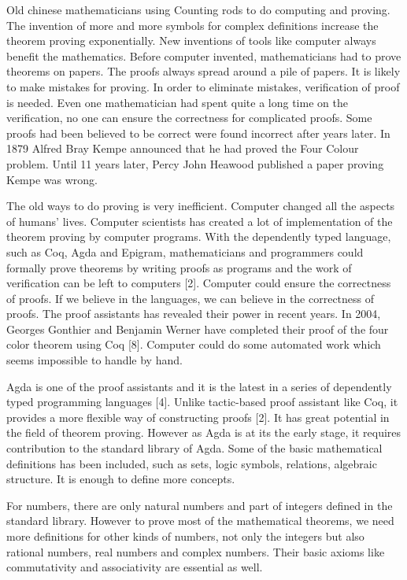 \documentclass{article}
\begin{document}
Old chinese mathematicians using Counting rods to do computing and proving. The invention of more and more symbols for complex definitions increase the theorem proving exponentially. New inventions of tools like computer always benefit the mathematics. Before computer invented, mathematicians had to prove theorems on papers. The proofs always spread around a pile of papers. It is likely to make mistakes for proving. In order to eliminate mistakes, verification of proof is needed. Even one mathematician had spent quite a long time on the verification, no one can ensure the correctness for complicated proofs. Some proofs had been believed to be correct were found incorrect after years later. In 1879 Alfred Bray Kempe announced that he had proved the Four Colour problem. Until 11 years later, Percy John Heawood published a paper proving Kempe was wrong. 

The old ways to do proving is very inefficient. Computer changed all the aspects of humans' lives. Computer scientists has created a lot of implementation of the theorem proving by computer programs. With the dependently typed language, such as Coq, Agda and Epigram, mathematicians and programmers could formally prove theorems by writing proofs as programs and the work of verification can be left to computers [2]. Computer could ensure the correctness of proofs. If we believe in the languages, we can believe in the correctness of proofs. The proof assistants has revealed their power in recent years. In 2004, Georges Gonthier and Benjamin Werner have completed
their proof of the four color theorem using Coq [8]. Computer could do some automated work which seems impossible to handle by hand.

Agda is one of the proof assistants and it is the latest in a series of dependently typed programming languages [4]. Unlike tactic-based proof assistant like Coq, it provides a more flexible way of constructing proofs [2]. It has great potential in the field of theorem proving. However as Agda is at its the early stage, it requires contribution to the standard library of Agda. Some of the basic mathematical definitions has been included, such as sets, logic symbols, relations, algebraic structure. It is enough to define more concepts.

For numbers, there are only natural numbers and part of integers defined in the standard library. However to prove most of the mathematical theorems, we need more definitions for other kinds of numbers, not only the integers but also rational numbers, real numbers and complex numbers. Their basic axioms like commutativity and associativity are essential as well.
\end{document}
